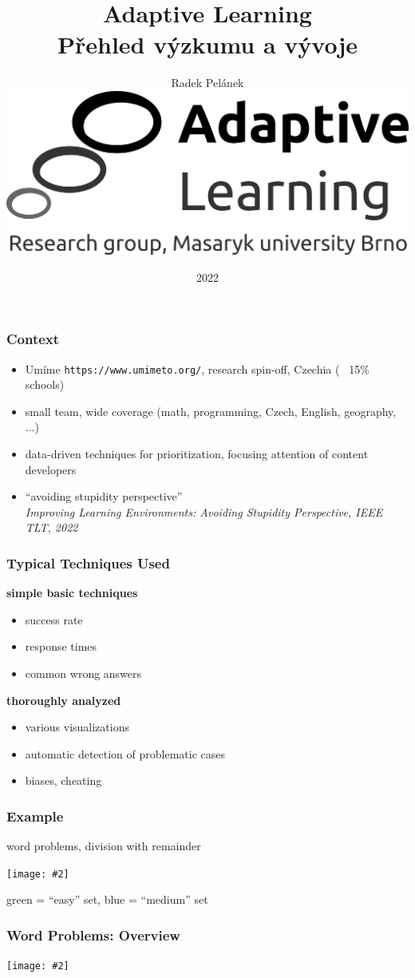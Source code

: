 \documentclass[bigger]{beamer}
\title{Adaptive Learning\\Přehled výzkumu a vývoje}
\author{Radek Pelánek\\[10mm]
  \includegraphics[width=.2\linewidth]{al-logo-researchgroup}}
\date{2022}
\newcommand{\img}[2]{\begin{center}\texttt{[image: \#2]}\end{center}}
\begin{document}
\frame{\titlepage}

\begin{frame}
  \frametitle{Context}

  \begin{itemize}
  \item Umíme \texttt{https://www.umimeto.org/}, research spin-off, Czechia
    (~ 15\% schools)
  \item small team, wide coverage (math, programming, Czech, English,
    geography, ...)
  \item data-driven techniques for prioritization, focusing attention of
    content developers
  \item ``avoiding stupidity perspective''\\
    \emph{Improving Learning Environments: Avoiding Stupidity Perspective, IEEE
      TLT, 2022}
  \end{itemize}
\end{frame}

\begin{frame}
  \frametitle{Typical Techniques Used}

  \textbf{simple basic techniques}
  \begin{itemize}
  \item success rate
  \item response times
  \item common wrong answers
  \end{itemize}

  \bigskip

  \textbf{thoroughly analyzed}
  \begin{itemize}
  \item various visualizations
  \item automatic detection of problematic cases
  \item biases, cheating
  \end{itemize}
\end{frame}

\begin{frame}
  \frametitle{Example}

  word problems, division with remainder

  \img{.9}{wp-division-remainder}

  {\small green = ``easy'' set, blue = ``medium'' set}
\end{frame}

\begin{frame}
  \frametitle{Word Problems: Overview}

  \img{.9}{wp-overview}
\end{frame}
\end{document}
